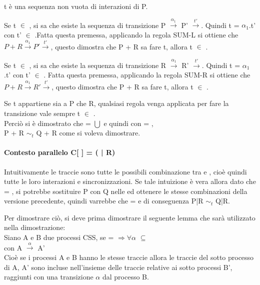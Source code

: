 t è una sequenza non vuota di interazioni di P.

Se t $\in$ , si sa che esiste la sequenza di transizione P $\overset{\alpha_{1}}\rightarrow$ P' $\overset{t'}\rightarrow$. Quindi t = $\alpha_{1}$.t' con t' $\in$ .Fatta questa premessa, applicando la regola SUM-L si ottiene che $P + R \overset{\alpha_{1}}\rightarrow P'\overset{t'}\rightarrow$, questo dimostra che P + R sa fare t, allora t $\in$ .

Se t $\in$ , si sa che esiste la sequenza di transizione R $\overset{\alpha_{1}}\rightarrow$ R' $\overset{t'}\rightarrow$. Quindi t = $\alpha_{1}$.t' con t' $\in$ . Fatta questa premessa, applicando la regola SUM-R si ottiene che $P + R \overset{\alpha_{1}}\rightarrow R'\overset{t'}\rightarrow$, questo dimostra che P + R sa fare t, allora t $\in$ .

Se t appartiene sia a P che R, qualsiasi regola venga applicata per fare la transizione vale sempre t $\in$ .\\

Perciò si è dimostrato che  =  $\bigcup$  e quindi con  = ,\\ P + R $\sim_{t}$ Q + R come si voleva dimostrare.

\paragraph{Contesto parallelo  C[ ] = (\hspace{0.3cm} | R)} \mbox{}

Intuitivamente le traccie  sono tutte le possibili combinazione tra  e , cioè quindi tutte le loro interazioni e sincronizzazioni. Se tale intuizione è vera allora dato che  = , si potrebbe sostituire P con Q nelle  ed ottenere le stesse combinazioni della versione precedente, quindi varrebbe che  =  e di conseguenza P|R $\sim_{t}$ Q|R.

Per dimostrare ciò, si deve prima dimostrare il seguente lemma che sarà utilizzato nella dimostrazione:\\
Siano A e B due processi CSS, se  =  $\Rightarrow \forall\alpha$ $\subseteq$ \\con A $ \overset{\alpha}\rightarrow $ A'\\
Cioè se i processi A e B hanno le stesse traccie allora le traccie del sotto processo di A, A' sono incluse nell'insieme delle traccie relative ai sotto processi B', raggiunti con una transizione $\alpha$ dal processo B.\\

